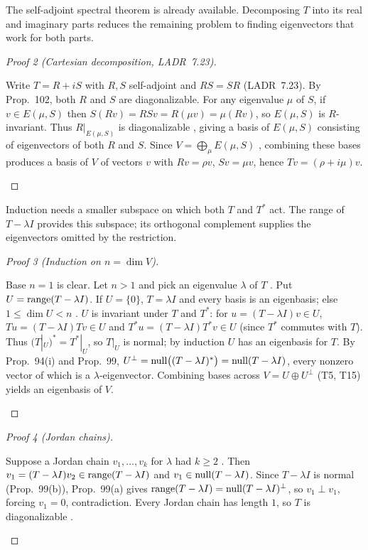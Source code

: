 \documentclass[10pt]{scrartcl}
\begin{document}
\begin{ideabox}
  The self-adjoint spectral theorem is already available. Decomposing $T$ into its real and imaginary parts reduces the remaining problem to finding eigenvectors that work for both parts.
\end{ideabox}
\begin{proof}[Proof 2 (Cartesian decomposition, LADR~7.23)]
  \begin{steps}
    \ii Write $T=R+iS$ with $R,S$ self-adjoint and $RS=SR$ (LADR~7.23). By Prop.~102, both $R$ and $S$ are diagonalizable.
    \ii For any eigenvalue $\mu$ of $S$, if $v\in E(\mu,S)$ then $S(Rv)=RSv=R(\mu v)=\mu(Rv)$, so $E(\mu,S)$ is $R$-invariant.
    \ii Thus $R|_{E(\mu,S)}$ is diagonalizable , giving a basis of $E(\mu,S)$ consisting of eigenvectors of both $R$ and $S$.
    \ii Since $V=\bigoplus_\mu E(\mu,S)$ , combining these bases produces a basis of $V$  of vectors $v$ with $Rv=\rho v$, $Sv=\mu v$, hence $Tv=(\rho+i\mu)v$.
  \end{steps}
\end{proof}

\begin{ideabox}
  Induction needs a smaller subspace on which both $T$ and $T^*$ act. The range of $T-\lambda I$ provides this subspace; its orthogonal complement supplies the eigenvectors omitted by the restriction.
\end{ideabox}
\begin{proof}[Proof 3 (Induction on $n=\dim V$)]
  \begin{steps}
    \ii Base $n=1$ is clear. Let $n>1$ and pick an eigenvalue $\lambda$ of $T$ . Put $U=\operatorname{range}(T-\lambda I)$. If $U=\{0\}$, $T=\lambda I$ and every basis is an eigenbasis; else $1\le \dim U < n$ .
    \ii $U$ is invariant under $T$ and $T^*$: for $u=(T-\lambda I)v\in U$, $Tu=(T-\lambda I)Tv\in U$ and $T^*u=(T-\lambda I)T^*v\in U$ (since $T^*$ commutes with $T$).
    \ii Thus $(T|_U)^*=T^*|_U$, so $T|_U$ is normal; by induction $U$ has an eigenbasis for $T$.
    \ii By Prop.~94(i) and Prop.~99, $U^\perp = \operatorname{null}\bigl((T-\lambda I)^*\bigr) = \operatorname{null}(T-\lambda I)$, every nonzero vector of which is a $\lambda$-eigenvector.
    \ii Combining bases across $V=U\oplus U^\perp$ (T5, T15) yields an eigenbasis of $V$.
  \end{steps}
\end{proof}


\begin{proof}[Proof 4 (Jordan chains)]
  \begin{steps}
    \ii Suppose a Jordan chain $v_1,\dots,v_k$ for $\lambda$ had $k\ge2$ . Then $v_1=(T-\lambda I)v_2\in\operatorname{range}(T-\lambda I)$ and $v_1\in\operatorname{null}(T-\lambda I)$.
    \ii Since $T-\lambda I$ is normal (Prop.~99(b)), Prop.~99(a) gives $\operatorname{range}(T-\lambda I)=\operatorname{null}(T-\lambda I)^\perp$, so $v_1\perp v_1$, forcing $v_1=0$, contradiction.
    \ii Every Jordan chain has length $1$, so $T$ is diagonalizable .
  \end{steps}
\end{proof}
\end{document}
